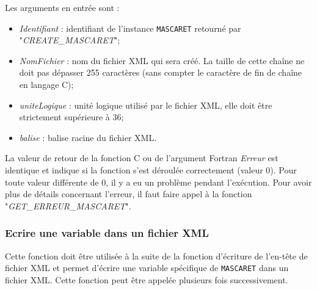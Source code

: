 \documentclass[a4paper,11pt]{article}
\begin{document}
 \vspace{0.5cm}
 
 Les arguments en entr\'ee sont :
 
 \vspace{0.5cm}
 
 \begin{itemize}
 
    \item \textit{Identifiant} : identifiant de l'instance \texttt{MASCARET} retourn\'e par "\textit{CREATE\_MASCARET}";
    
    \vspace{0.5cm}
    
    \item \textit{NomFichier} : nom du fichier XML qui sera cr\'e\'e. La taille de cette cha\^ine ne doit pas d\'epasser 255 caract\`eres (sans compter le caract\`ere de fin de cha\^ine en langage C);
    
    \vspace{0.5cm}
    
    \item \textit{uniteLogique} : unit\'e logique utilis\'e par le fichier XML, elle doit \^etre strictement sup\'erieure \`a 36;
    
    \vspace{0.5cm}
    
    \item \textit{balise} : balise racine du fichier XML.
    
 \end{itemize}
 
 \vspace{0.5cm}
 
 La valeur de retour de la fonction C ou de l'argument Fortran \textit{Erreur} est identique et indique si la fonction s'est d\'eroul\'ee correctement (valeur 0). Pour toute valeur diff\'erente de 0, il y a eu un probl\`eme pendant l'ex\'ecution. Pour avoir plus de d\'etails concernant l'erreur, il faut faire appel \`a la fonction "\textit{GET\_ERREUR\_MASCARET}".

\subsubsection{Ecrire une variable dans un fichier XML}

 Cette fonction doit \^etre utilis\'ee \`a la suite de la fonction d'\'ecriture de l'en-t\^ete de fichier XML et permet d'\'ecrire une variable sp\'ecifique de \texttt{MASCARET} dans un fichier XML. Cette fonction peut \^etre appel\'ee plusieurs fois successivement.
 
\end{document}
